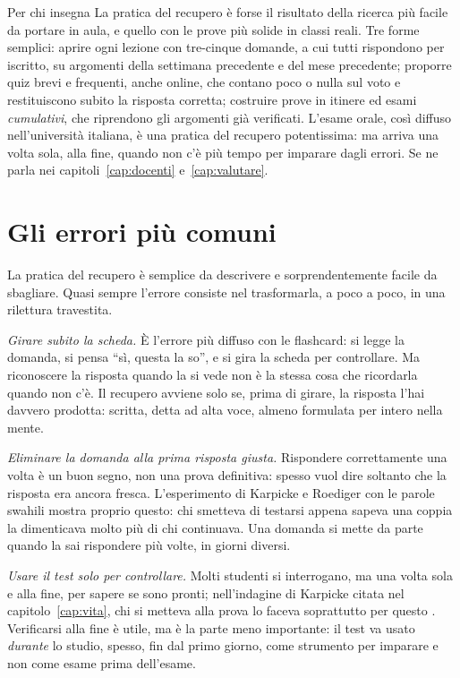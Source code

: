 \begin{riquadro}{Per chi insegna}
La pratica del recupero è forse il risultato della ricerca più facile da
portare in aula, e quello con le prove più solide in classi reali. Tre
forme semplici: aprire ogni lezione con tre-cinque domande, a cui tutti
rispondono per iscritto, su argomenti della settimana precedente e del
mese precedente; proporre quiz brevi e frequenti, anche online, che
contano poco o nulla sul voto e restituiscono subito la risposta
corretta; costruire prove in itinere ed esami \emph{cumulativi}, che
riprendono gli argomenti già verificati. L'esame orale, così diffuso
nell'università italiana, è una pratica del recupero potentissima: ma
arriva una volta sola, alla fine, quando non c'è più tempo per
imparare dagli errori. Se ne parla nei capitoli~\ref{cap:docenti}
e~\ref{cap:valutare}.
\end{riquadro}

\section{Gli errori più comuni}

La pratica del recupero è semplice da descrivere e sorprendentemente
facile da sbagliare. Quasi sempre l'errore consiste nel trasformarla, a
poco a poco, in una rilettura travestita.

\emph{Girare subito la scheda.} È l'errore più diffuso con le
flashcard: si legge la domanda, si pensa \enquote{sì, questa la so}, e
si gira la scheda per controllare. Ma riconoscere la risposta quando la
si vede non è la stessa cosa che ricordarla quando non c'è. Il recupero
avviene solo se, prima di girare, la risposta l'hai davvero prodotta:
scritta, detta ad alta voce, almeno formulata per intero nella mente.

\emph{Eliminare la domanda alla prima risposta giusta.} Rispondere
correttamente una volta è un buon segno, non una prova definitiva:
spesso vuol dire soltanto che la risposta era ancora fresca. L'esperimento
di Karpicke e Roediger con le parole swahili mostra proprio questo: chi
smetteva di testarsi appena sapeva una coppia la dimenticava molto più
di chi continuava. Una domanda si mette da parte quando la sai
rispondere più volte, in giorni diversi.

\emph{Usare il test solo per controllare.} Molti studenti si interrogano,
ma una volta sola e alla fine, per sapere se sono pronti; nell'indagine
di Karpicke citata nel capitolo~\ref{cap:vita}, chi si metteva alla
prova lo faceva soprattutto per questo \parencite{karpicke2009}.
Verificarsi alla fine è utile, ma è la parte meno importante: il test
va usato \emph{durante} lo studio, spesso, fin dal primo giorno, come
strumento per imparare e non come esame prima dell'esame.

